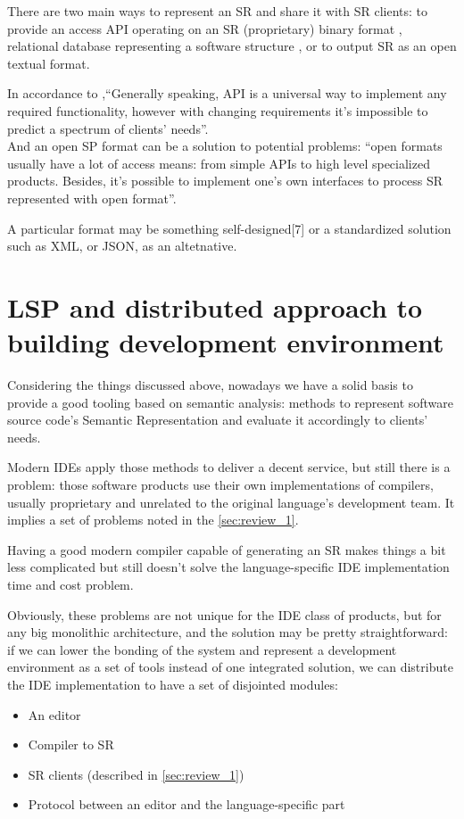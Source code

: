 There are two main ways to represent an SR and share it with SR clients: to
provide an access API operating on an SR (proprietary) binary format \cite{Cannon, FreeSoftwareFoundation2016},
relational database representing a software structure \cite{Linton1983}, or to output SR as an
open textual format\cite{TheRustTeam2016}.

In accordance to \cite{Zouev2005},``Generally speaking, API is a universal way to implement any required
functionality, however with changing requirements it’s impossible to predict a
spectrum of clients’ needs''.\\
And an open SP format can be a solution to potential problems: ``open formats
usually have a lot of access means: from simple APIs to high level specialized
products. Besides, it’s possible to implement one’s own interfaces to process SR
represented with open format''.

A particular format may be something self-designed[7] or a standardized
solution such as XML\cite{Germon}, or JSON\cite{ECMA-4042013}, as an altetnative.

\section{LSP and distributed approach to building development
environment}
\label{sec:review_3}

Considering the things discussed above, nowadays we have a solid basis to
provide a good tooling based on semantic analysis: methods to represent
software source code’s Semantic Representation and evaluate it accordingly to
clients’ needs.

Modern IDEs apply those methods to deliver a decent service, but still there is a
problem: those software products use their own implementations of compilers,
usually proprietary and unrelated to the original language’s development team.
It implies a set of problems noted in the \ref{sec:review_1}.

Having a good modern compiler capable of generating an SR makes things a bit
less complicated but still doesn’t solve the language-specific IDE
implementation time and cost problem.

Obviously, these problems are not unique for the IDE class of products, but for
any big monolithic architecture, and the solution may be pretty straightforward:
if we can lower the bonding of the system and represent a development
environment as a set of tools instead of one integrated solution, we can
distribute the IDE implementation to have a set of disjointed modules:
\begin{itemize}
    \item An editor
    \item Compiler to SR
    \item SR clients (described in \ref{sec:review_1})
    \item Protocol between an editor and the language-specific part
\end{itemize}

